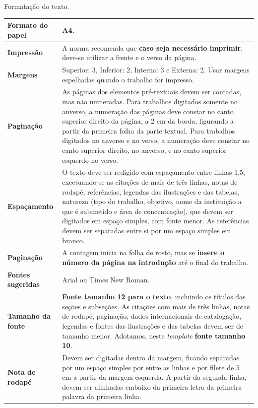 \begin{quadro}[htb]
	\centering
	\caption{\label{qua:Quadro_1}Formatação do texto.}	
	\begin{tabular}{|l|p{11cm}|}
		\hline
		\textbf{Formato do papel} & A4.\\ \hline
		\textbf{Impressão}        & A norma recomenda que \textbf{caso seja necessário imprimir}, deve-se utilizar a frente e o verso da página.\\ \hline
		\textbf{Margens}          & Superior: 3, Inferior: 2, Interna: 3 e Externa: 2. Usar margens espelhadas quando o  trabalho for impresso.\\ \hline
		\textbf{Paginação}        & As páginas dos elementos pré-textuais devem ser contadas, mas não numeradas. Para trabalhos digitados somente no anverso, a numeração das páginas deve constar no canto superior direito da página, a 2 cm da borda, figurando a partir da primeira folha da  parte textual. Para trabalhos digitados no anverso e no verso, a numeração deve constar no canto superior direito, no anverso, e no canto superior esquerdo no verso.\\ \hline
		\textbf{Espaçamento}      & O texto deve ser redigido com espaçamento entre linhas 1,5, excetuando-se as citações de mais de três linhas, notas de rodapé, referências, legendas das ilustrações e das tabelas, natureza (tipo do trabalho, objetivo, nome da instituição a que é submetido e área de concentração), que devem ser digitados em espaço simples, com fonte menor. As referências devem ser separadas entre si por um espaço simples em branco.\\ \hline
		\textbf{Paginação}        & A contagem inicia na folha de rosto, mas se \textbf{insere o número da página na introdução} até o final do trabalho.\\ \hline
		\textbf{Fontes sugeridas} & Arial ou Times New Roman.\\ \hline
		\textbf{Tamanho da fonte} & \textbf{Fonte tamanho 12 para o texto}, incluindo os títulos das seções e subseções. As citações com mais de três linhas, notas de rodapé, paginação, dados internacionais de catalogação, legendas e fontes das ilustrações e das tabelas devem ser de tamanho menor. Adotamos, neste \textit{template} \textbf{fonte tamanho 10}.\\ \hline
		\textbf{Nota de rodapé}   & Devem ser digitadas dentro da margem, ficando separadas por um espaço simples por entre as linhas e por filete de 5 cm a partir da margem esquerda. A partir da segunda linha, devem ser alinhadas embaixo da primeira letra da primeira palavra da primeira linha.\\ \hline
	\end{tabular}
\end{quadro}

